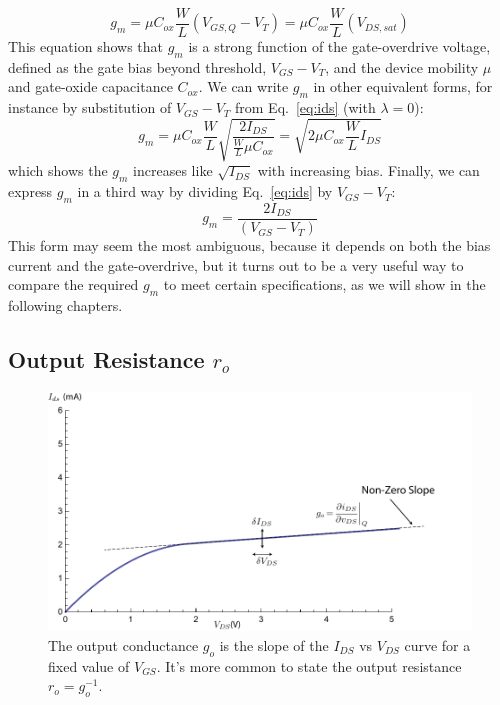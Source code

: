 \begin{equation}
	{g_m} = \mu {C_{ox}}\frac{W}{L}({V_{GS,Q}} - {V_T}) = \mu {C_{ox}}\frac{W}{L}(V_{DS,sat})
\end{equation}
%
This equation shows that $g_m$ is a strong function of the gate-overdrive voltage, defined as the gate bias beyond threshold, $V_{GS} - V_T$, and the device mobility $\mu$ and gate-oxide capacitance $C_{ox}$.  We can write $g_m$ in other equivalent forms, for instance by substitution of $V_{GS}-V_T$ from Eq.~\ref{eq:ids} (with $\lambda = 0$):
%
\begin{equation}
	{g_m} = \mu {C_{ox}}\frac{W}{L}\sqrt {\frac{{2{I_{DS}}}}{{\frac{W}{L}\mu {C_{ox}}}}}  = \sqrt {2\mu {C_{ox}}\frac{W}{L}{I_{DS}}} \end{equation}
%
which shows the $g_m$ increases like $\sqrt{I_{DS}}$ with increasing bias.  Finally, we can express $g_m$ in a third way by dividing Eq.~\ref{eq:ids} by $V_{GS}-V_T$:
%
\begin{equation}
	{g_m} = \frac{{2{I_{DS}}}}{{({V_{GS}} - {V_T})}} \label{eq:gm_vstar}
\end{equation} 
%
This form may seem the most ambiguous, because it depends on both the bias current and the gate-overdrive, but it turns out to be a very useful way to compare the required $g_m$ to meet certain specifications, as we will show in the following chapters.

 




\subsection{Output Resistance $r_o$}

\begin{figure}[tb]
\begin{center}
\includegraphics[width=.75\columnwidth]{ids_idsat_ro}
\end{center}
\caption{The output conductance $g_o$ is the slope of the $I_{DS}$ vs $V_{DS}$ curve for a fixed value of $V_{GS}$.  It's more common to state the output resistance $r_o = g_o^{-1}$.} \label{fig:ids_idsat_ro}
\end{figure}

